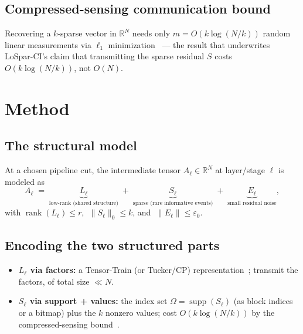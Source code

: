 \documentclass[11pt]{article}
\newcommand{\term}[1]{\textbf{\color{accent!85!black}#1}}
\newcommand{\R}{\mathbb{R}}
\newcommand{\norm}[1]{\lVert #1 \rVert}
\begin{document}
\subsection{Compressed-sensing communication bound}
Recovering a $k$-sparse vector in $\R^N$ needs only $m=O(k\log(N/k))$ random linear
measurements via $\ell_1$ minimization~\cite{candestao,donoho} --- the result that underwrites
LoSpar-CI's claim that transmitting the sparse residual $S$ costs $O(k\log(N/k))$, not $O(N)$.

\section{Method}
\label{sec:method}

\subsection{The structural model}
At a chosen pipeline cut, the intermediate tensor $A_\ell\in\R^{N}$ at layer/stage $\ell$ is
modeled as
\[
A_\ell \;=\; \underbrace{L_\ell}_{\text{low-rank (shared structure)}}
\;+\; \underbrace{S_\ell}_{\text{sparse (rare informative events)}}
\;+\; \underbrace{E_\ell}_{\text{small residual noise}} ,
\]
with $\operatorname{rank}(L_\ell)\le r$, $\;\norm{S_\ell}_0 \le k$, and $\;\norm{E_\ell}\le \varepsilon_0$.

\subsection{Encoding the two structured parts}
\begin{itemize}[leftmargin=1.5em,itemsep=1pt]
\item \term{$L_\ell$ via factors:} a Tensor-Train (or Tucker/CP) representation~\cite{tt,kolda};
transmit the factors, of total size $\ll N$.
\item \term{$S_\ell$ via support + values:} the index set $\Omega=\operatorname{supp}(S_\ell)$
(as block indices or a bitmap) plus the $k$ nonzero values; cost $O(k\log(N/k))$ by the
compressed-sensing bound~\cite{candestao,donoho}.
\end{itemize}
\end{document}
